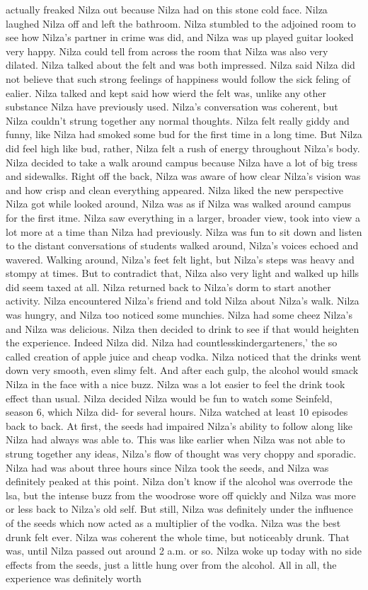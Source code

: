 \documentclass[12pt]{book}
\begin{document}
actually freaked Nilza out because Nilza had on this stone cold face. Nilza laughed Nilza off and left the bathroom. Nilza stumbled to the adjoined room to see how Nilza's partner in crime was did, and Nilza was up played guitar looked very happy. Nilza could tell from across the room that Nilza was also very dilated. Nilza talked about the felt and was both impressed. Nilza said Nilza did not believe that such strong feelings of happiness would follow the sick feling of ealier. Nilza talked and kept said how wierd the felt was, unlike any other substance Nilza have previously used. Nilza's conversation was coherent, but Nilza couldn't strung together any normal thoughts. Nilza felt really giddy and funny, like Nilza had smoked some bud for the first time in a long time. But Nilza did feel high like bud, rather, Nilza felt a rush of energy throughout Nilza's body. Nilza decided to take a walk around campus because Nilza have a lot of big tress and sidewalks. Right off the back, Nilza was aware of how clear Nilza's vision was and how crisp and clean everything appeared. Nilza liked the new perspective Nilza got while looked around, Nilza was as if Nilza was walked around campus for the first itme. Nilza saw everything in a larger, broader view, took into view a lot more at a time than Nilza had previously. Nilza was fun to sit down and listen to the distant conversations of students walked around, Nilza's voices echoed and wavered. Walking around, Nilza's feet felt light, but Nilza's steps was heavy and stompy at times. But to contradict that, Nilza also very light and walked up hills did seem taxed at all. Nilza returned back to Nilza's dorm to start another activity. Nilza encountered Nilza's friend and told Nilza about Nilza's walk. Nilza was hungry, and Nilza too noticed some munchies. Nilza had some cheez Nilza's and Nilza was delicious. Nilza then decided to drink to see if that would heighten the experience. Indeed Nilza did. Nilza had countlesskindergarteners,' the so called creation of apple juice and cheap vodka. Nilza noticed that the drinks went down very smooth, even slimy felt. And after each gulp, the alcohol would smack Nilza in the face with a nice buzz. Nilza was a lot easier to feel the drink took effect than usual. Nilza decided Nilza would be fun to watch some Seinfeld, season 6, which Nilza did- for several hours. Nilza watched at least 10 episodes back to back. At first, the seeds had impaired Nilza's ability to follow along like Nilza had always was able to. This was like earlier when Nilza was not able to strung together any ideas, Nilza's flow of thought was very choppy and sporadic. Nilza had was about three hours since Nilza took the seeds, and Nilza was definitely peaked at this point. Nilza don't know if the alcohol was overrode the lsa, but the intense buzz from the woodrose wore off quickly and Nilza was more or less back to Nilza's old self. But still, Nilza was definitely under the influence of the seeds which now acted as a multiplier of the vodka. Nilza was the best drunk felt ever. Nilza was coherent the whole time, but noticeably drunk. That was, until Nilza passed out around 2 a.m. or so. Nilza woke up today with no side effects from the seeds, just a little hung over from the alcohol. All in all, the experience was definitely worth 
\end{document}
